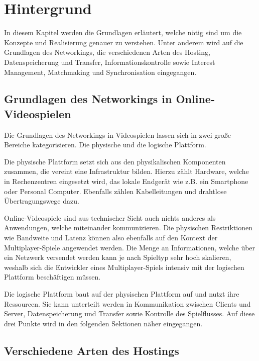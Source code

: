 
\chapter{Hintergrund}
\label{sec:hintergrund}

In diesem Kapitel werden die Grundlagen erläutert, welche nötig sind um die Konzepte und Realisierung genauer zu verstehen. Unter anderem wird auf die Grundlagen des Networkings, die verschiedenen Arten des Hosting, Datenspeicherung und Transfer, Informationskontrolle sowie Interest Management, Matchmaking und Synchronisation eingegangen.

\section{Grundlagen des Networkings in Online-Videospielen}

Die Grundlagen des Networkings in Videospielen lassen sich in zwei große Bereiche kategorisieren. Die physische und die logische Plattform. 

Die physische Plattform setzt sich aus den physikalischen Komponenten zusammen, die vereint eine Infrastruktur bilden. Hierzu zählt Hardware, welche in Rechenzentren eingesetzt wird, das lokale Endgerät wie z.B. ein Smartphone oder Personal Computer. Ebenfalls zählen Kabelleitungen und drahtlose Übertragungswege dazu. 

Online-Videospiele sind aus technischer Sicht auch nichts anderes als Anwendungen, welche miteinander kommunizieren. Die physischen Restriktionen wie Bandweite und Latenz können also ebenfalls auf den Kontext der Multiplayer-Spiele angewendet werden. Die Menge an Informationen, welche über ein Netzwerk versendet werden kann je nach Spieltyp sehr hoch skalieren, weshalb sich die Entwickler eines Multiplayer-Spiels intensiv mit der logischen Plattform beschäftigen müssen.

Die logische Plattform baut auf der physischen Plattform auf und nutzt ihre Ressourcen. Sie kann unterteilt werden in Kommunikation zwischen Clients und Server, Datenspeicherung und Transfer sowie Kontrolle des Spielflusses. Auf diese drei Punkte wird in den folgenden Sektionen näher eingegangen.

\cite{Smed.2002c}


\section{Verschiedene Arten des Hostings}

